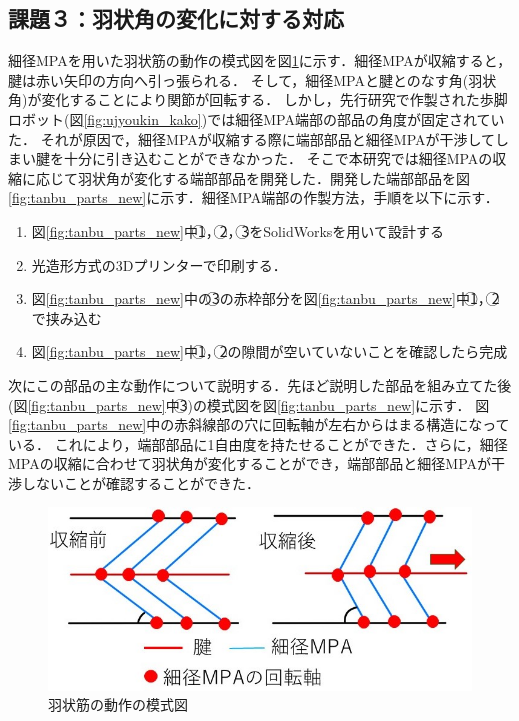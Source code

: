 \subsection{課題３：羽状角の変化に対する対応}
細径MPAを用いた羽状筋の動作の模式図を図\ref{fig:ujyoukin_moshiki}に示す．細径MPAが収縮すると，腱は赤い矢印の方向へ引っ張られる．
そして，細径MPAと腱とのなす角(羽状角)が変化することにより関節が回転する．
しかし，先行研究で作製された歩脚ロボット(図\ref{fig:ujyoukin_kako})では細径MPA端部の部品の角度が固定されていた．
それが原因で，細径MPAが収縮する際に端部部品と細径MPAが干渉してしまい腱を十分に引き込むことができなかった．
そこで本研究では細径MPAの収縮に応じて羽状角が変化する端部部品を開発した．開発した端部部品を図\ref{fig:tanbu_parts_new}に示す．細径MPA端部の作製方法，手順を以下に示す．
\vspace{3mm}
\begin{enumerate}
  \item 図\ref{fig:tanbu_parts_new}中\textcircled{\scriptsize 1}，\textcircled{\scriptsize 2}，\textcircled{\scriptsize 3}をSolidWorksを用いて設計する
  \item 光造形方式の3Dプリンターで印刷する．
  \item 図\ref{fig:tanbu_parts_new}中の\textcircled{\scriptsize 3}の赤枠部分を図\ref{fig:tanbu_parts_new}中\textcircled{\scriptsize 1}，\textcircled{\scriptsize 2}で挟み込む
  \item 図\ref{fig:tanbu_parts_new}中\textcircled{\scriptsize 1}，\textcircled{\scriptsize 2}の隙間が空いていないことを確認したら完成
\end{enumerate}
次にこの部品の主な動作について説明する．先ほど説明した部品を組み立てた後(図\ref{fig:tanbu_parts_new}中\textcircled{\scriptsize 3})の模式図を図\ref{fig:tanbu_parts_new}に示す．
図\ref{fig:tanbu_parts_new}中の赤斜線部の穴に回転軸が左右からはまる構造になっている．
これにより，端部部品に1自由度を持たせることができた．さらに，細径MPAの収縮に合わせて羽状角が変化することができ，端部部品と細径MPAが干渉しないことが確認することができた．
%
\begin{figure}[ht]
  \centering
  \includegraphics[scale=0.5]{image/ujyoukin.jpg}
  \caption{羽状筋の動作の模式図}
  \label{fig:ujyoukin_moshiki}
\end{figure}
